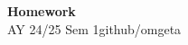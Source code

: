 \documentclass[12pt, a4paper]{article}
\newcommand{\mytitle}{Homework}
\newcommand{\myauthor}{github/omgeta}
\newcommand{\mydate}{AY 24/25 Sem 1}
\begin{document}
\raggedright
\footnotesize
\begin{center}
{\normalsize{\textbf{\mytitle}}} \\
{\normalsize{\mydate\hspace{2pt}\textemdash\hspace{2pt}\myauthor}}
\end{center}

\begin{enumerate}[Q\arabic*.]
\end{enumerate}
\end{document}
